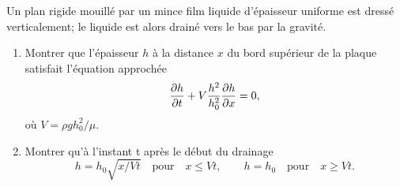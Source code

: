 Un plan rigide mouill\'e par un mince film liquide d'\'epaisseur uniforme 
est dress\'e verticalement; le liquide est alors drain\'e vers le bas par la gravit\'e. 

\begin{enumerate}
\item 
  Montrer que l'\'epaisseur $h$ \`a la distance $x$ du bord sup\'erieur de la plaque 
  satisfait l'\'equation approch\'ee %
  $$
  \frac {\partial h} {\partial t} + V \frac{h^2}{h_0^2} \frac {\partial h} {\partial x} = 0,
  $$
  o\`u $V = \rho g h_0^2 / \mu$.
\item 
  Montrer qu'\`a l'instant t apr\`es le d\'ebut du drainage
  $$
  h = h_0 \sqrt{x/Vt} \quad \textrm{pour} \quad x \le Vt, 
  \qquad h = h_0 \quad \textrm{pour} \quad x \ge Vt.
  $$
\end{enumerate}
